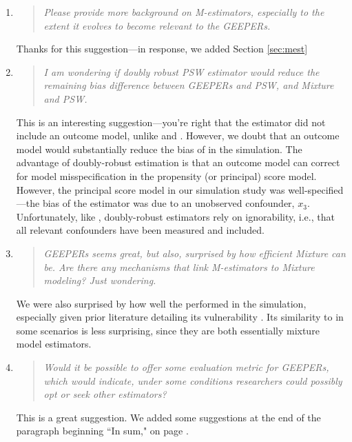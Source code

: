 \documentclass[]{article}
\newenvironment{itquote}
  {\begin{quote} \itshape}
  {\end{quote}\ignorespacesafterend}
\begin{document}
\begin{enumerate}

\item \begin{itquote}   Please provide more background on M-estimators, especially to the extent it evolves to become relevant to the GEEPERs. 
\end{itquote}
Thanks for this suggestion---in response, we added Section \ref{sec:mest}
\item \begin{itquote}      I am wondering if doubly robust PSW estimator would reduce the remaining bias difference between GEEPERs and PSW, and Mixture and PSW.
\end{itquote}
This is an interesting suggestion---you're right that the \psw estimator did not include an outcome model, unlike \geepers and \pmm. However, we doubt that an outcome model would substantially reduce the bias of \psw in the simulation. The advantage of doubly-robust estimation is that an outcome model can correct for model misspecification in the propensity (or principal) score model. However, the principal score model in our simulation study was well-specified---the bias of the \psw estimator was due to an unobserved confounder, $x_3$. Unfortunately, like \psw, doubly-robust estimators rely on ignorability, i.e., that all relevant confounders have been measured and included. 
\item \begin{itquote}      GEEPERs seems great, but also, surprised by how efficient Mixture can be. Are there any mechanisms that link M-estimators to Mixture modeling? Just wondering.
\end{itquote}
We were also surprised by how well the \pmm performed in the simulation, especially given prior literature detailing its vulnerability \citep[][; cited in the paper]{griffin2008application,feller2016principal}. Its similarity to \geepers in some scenarios is less surprising, since they are both essentially mixture model estimators.

\item \begin{itquote}    Would it be possible to offer some evaluation metric for GEEPERs, which would indicate, under some conditions researchers could possibly opt or seek other estimators?
\end{itquote}
This is a great suggestion. We added some suggestions at the end of the paragraph beginning ``In sum," on page \pageref{simsum}.


\end{enumerate}
\end{document}
